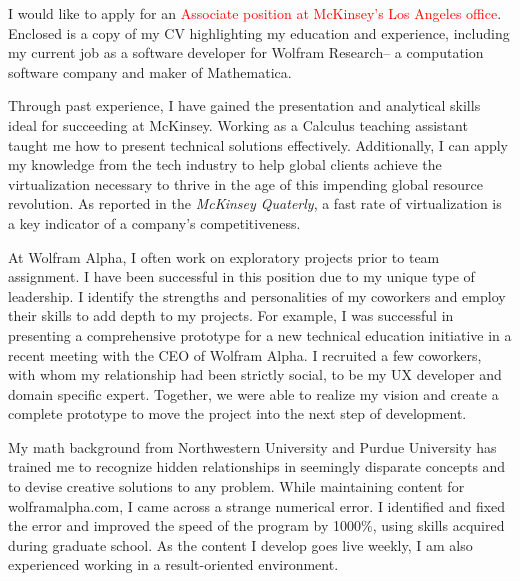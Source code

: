 \documentclass[11pt,a4paper,unicode]{moderncv}
\begin{document}
\makelettertitle %
	I would like to apply for an \textcolor{red}{Associate position at McKinsey's Los Angeles office}. Enclosed is a copy of my CV highlighting my education and experience, including my current job as a software developer for Wolfram Research-- a computation software company and maker of Mathematica. 
		
\vspace{3mm}  
Through past experience, I have gained the presentation and analytical skills ideal for succeeding at McKinsey. Working as a Calculus teaching assistant taught me how to present technical solutions effectively. Additionally, I can apply my knowledge from the tech industry to help global clients achieve the virtualization necessary to thrive in the age of this impending global resource revolution. As reported in the \emph{McKinsey Quaterly}, a fast rate of virtualization is a key indicator of a company's competitiveness. 

\vspace{3mm}
At Wolfram Alpha, I often work on exploratory projects prior to team assignment. I have been successful in this position due to my unique type of leadership. I identify the strengths and personalities of my coworkers and employ their skills to add depth to my projects. For example, I was successful in presenting a comprehensive prototype for a new technical education initiative in a recent meeting with the CEO of Wolfram Alpha. I recruited a few coworkers, with whom my relationship had been strictly social, to be my UX developer and domain specific expert. Together, we were able to realize my vision and create a complete prototype to move the project into the next step of development.

\vspace{3mm}
My math background from Northwestern University and Purdue University has trained me to recognize hidden relationships in seemingly disparate concepts and to devise creative solutions to any problem. While maintaining content for wolframalpha.com, I came across a strange numerical error. I identified and fixed the error and improved the speed of the program by 1000$\%$, using skills acquired during graduate school. As the content I develop goes live weekly, I am also experienced working in a result-oriented environment.
\end{document}
